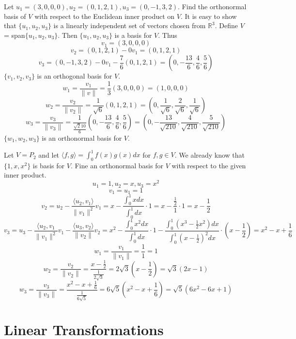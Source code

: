 \documentclass[12pt]{article}
\begin{document}
 \begin{example} Let $u_1 = (3, 0, 0, 0), u_2 = (0, 1, 2, 1), u_3 = (0, -1, 3, 2)$. Find the orthonormal basis of $V$ with respect to the Euclidean inner product on $V$. \newline It is easy to show that $\{u_1, u_2, u_3\}$ is a linearly independent set of vectors chosen from $\mathbb{R}^3$. Define $V$ = span$\{u_1, u_2, u_3\}$. Then $\{u_1, u_2, u_3\}$ is a basis for $V$. Thus $$v_1 = (3, 0, 0, 0)$$ $$v_2 = (0, 1, 2, 1) - 0v_1 = (0, 1, 2, 1) $$ $$v_3 = (0, -1, 3, 2) - 0v_1 - \frac{7}{6}(0, 1, 2, 1) = (0, -\frac{13}{6}, \frac{4}{6}, \frac{5}{6}) $$ $\{v_1, v_2, v_3\}$ is an orthogonal basis for $V$. $$w_1 = \frac{v_1}{\|v\|} = \frac{1}{3}(3, 0, 0, 0) = (1, 0, 0, 0) $$ $$w_2 = \frac{v_2}{\|v_2\|} = \frac{1}{\sqrt{6}}(0, 1, 2, 1) = (0, \frac{1}{\sqrt{6}}, \frac{2}{\sqrt{6}}, \frac{1}{\sqrt{6}})$$ $$w_3 = \frac{v_3}{\|v_3\|} = \frac{1}{\frac{\sqrt210}{6}}(0, -\frac{13}{6}, \frac{4}{6}, \frac{5}{6}) = (0, -\frac{13}{\sqrt{210}}, \frac{4}{\sqrt{210}}, \frac{5}{\sqrt{210}})$$ $\{w_1, w_2, w_3\}$ is an orthonormal basis for $V$. \end{example} 
 \begin{example} Let $V = P_2$ and let $\langle f, g\rangle = \int_0^1 f(x)g(x)dx$ for $f, g \in V$. We already know that $\{1, x, x^2\}$ is basis for $V$. Fine an orthonormal basis for $V$ with respect to the given inner product. $$u_1 = 1, u_2 = x, u_3 = x^2$$ $$v_1 = u_1 = 1$$ $$v_2 = u_2 - \frac{\langle u_2, v_1 \rangle}{\|v_1\|^2}v_1 = x - \frac{\int_0^1 xdx}{\int_0^1 dx}\cdot 1 = x - \frac{\frac{1}{2}}{1}\cdot 1 = x - \frac{1}{2} $$ $$v_3 = u_3 - \frac{\langle u_2, v_1}{\|v_1\|^2}v_1 - \frac{\langle u_3, v_2 \rangle}{\|v_2\|}v_2 = x^2 - \frac{\int_0^1 x^2dx}{\int_0^1 dx}\cdot 1 - \frac{\int_0^1 (x^3 - \frac{1}{2}x^2)dx}{\int_0^1 (x - \frac{1}{2})^2dx}\cdot (x - \frac{1}{2}) = x^2 - x + \frac{1}{6} $$ 
 $$ w_1 = \frac{v_1}{\|v_1\|} = \frac{1}{1} = 1$$ $$w_2 = \frac{v_2}{\|v_2\|} = \frac{x - \frac{1}{2}}{\frac{1}{2\sqrt{3}}} = 2\sqrt{3}(x - \frac{1}{2}) = \sqrt{3}(2x - 1) $$ 
 $$w_3 = \frac{v_3}{\|v_3\|} = \frac{x^2 - x + \frac{1}{6}}{\frac{1}{6\sqrt{5}}} = 6\sqrt{5}(x^2 - x + \frac{1}{6}) = \sqrt{5}(6x^2 - 6x + 1) $$ \end{example}
 
 \section{Linear Transformations} 
\end{document}
